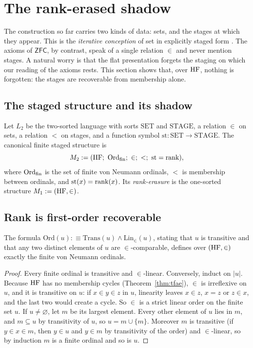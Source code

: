\section{The rank-erased shadow}\label{sec:shadow}

The construction so far carries two kinds of data: sets, and the stages at which they appear.
This is the \emph{iterative conception} of set in explicitly staged form
\citep{Boolos1971,Scott1974,Potter2004}. The axioms of $\mathsf{ZFC}$, by contrast, speak of a
single relation $\in$ and never mention stages. A natural worry is that the flat presentation
forgets the staging on which our reading of the axioms rests. This section shows that, over
$\mathrm{HF}$, nothing is forgotten: the stages are recoverable from membership alone.

\subsection{The staged structure and its shadow}

\begin{definition}\label{def:staged}
Let $L_2$ be the two-sorted language with sorts $\mathrm{SET}$ and $\mathrm{STAGE}$, a relation
$\in$ on sets, a relation $<$ on stages, and a function symbol $\mathrm{st}\colon\mathrm{SET}\to
\mathrm{STAGE}$. The canonical finite staged structure is
\[
  M_2:=(\HF;\ \Ord_{\mathrm{fin}};\ \in;\ <;\ \mathrm{st}=\rank),
\]
where $\mathrm{Ord}_{\mathrm{fin}}$ is the set of finite von Neumann ordinals, $<$ is membership between
ordinals, and $\mathrm{st}(x)=\operatorname{rank}(x)$. Its \emph{rank-erasure} is the one-sorted structure
$M_1:=(\mathrm{HF},\in)$.
\end{definition}

\subsection{Rank is first-order recoverable}

\begin{lemma}\label{lem:orddef}
The formula $\mathrm{Ord}(u):\equiv\mathrm{Trans}(u)\wedge\mathrm{Lin}_\in(u)$, stating that $u$
is transitive and that any two distinct elements of $u$ are $\in$-comparable, defines over
$(\mathrm{HF},\in)$ exactly the finite von Neumann ordinals.
\end{lemma}

\begin{proof}
Every finite ordinal is transitive and $\in$-linear. Conversely, induct on $|u|$. Because $\mathrm{HF}$ has
no membership cycles (Theorem~\ref{thm:tfae}), $\in$ is irreflexive on $u$, and it is transitive
on $u$: if $x\in y\in z$ in $u$, linearity leaves $x\in z$, $x=z$ or $z\in x$, and the last two
would create a cycle. So $\in$ is a strict linear order on the finite set $u$. If $u\ne\varnothing$,
let $m$ be its largest element. Every other element of $u$ lies in $m$, and $m\subseteq u$ by
transitivity of $u$, so $u=m\cup\{m\}$. Moreover $m$ is transitive (if $y\in x\in m$, then $y\in
u$ and $y\in m$ by transitivity of the order) and $\in$-linear, so by induction $m$ is a finite
ordinal and so is $u$.
\end{proof}

